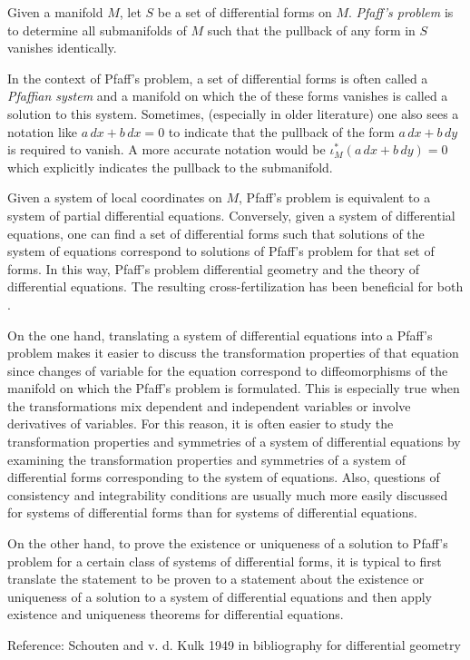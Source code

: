 \documentclass[12pt]{article}
\begin{document}
Given a manifold $M$, let $S$ be a set of differential forms on $M$.  \emph{Pfaff's problem} is to determine all submanifolds of $M$ such that the pullback of any form in $S$ vanishes identically.  

In the context of Pfaff's problem, a set of differential forms is often called a \emph{Pfaffian system} and a manifold on which the  of these forms vanishes is called a solution to this system.  Sometimes, (especially in older literature) one also sees a notation like $a \, dx + b\,dx = 0$ to indicate that the pullback of the form $a \, dx + b \, dy$ is required to vanish.  A more accurate notation would be $\iota_M^* (a \, dx + b \,dy) = 0$ which explicitly indicates the pullback to the submanifold.

Given a system of local coordinates on $M$, Pfaff's problem is equivalent to a system of partial differential equations.  Conversely, given a system of differential equations, one can find a set of differential forms such that solutions of the system of equations correspond to solutions of Pfaff's problem for that set of forms.  In this way, Pfaff's problem  differential geometry and the theory of differential equations.  The resulting cross-fertilization has been beneficial for both .

On the one hand, translating a system of differential equations into a Pfaff's problem makes it easier to discuss the transformation properties of that equation since changes of variable for the equation correspond to diffeomorphisms of the manifold on which the Pfaff's problem is formulated.  This is especially true when the transformations mix dependent and independent variables or involve derivatives of variables.  For this reason, it is often easier to study the transformation properties and symmetries of a system of differential equations by examining the transformation properties and symmetries of a system of differential forms corresponding to the system of equations.  Also, questions of consistency and integrability conditions are usually much more easily discussed for systems of differential forms than for systems of differential equations.

On the other hand, to prove the existence or uniqueness of a solution to Pfaff's problem for a certain class of systems of differential forms, it is typical to first translate the statement to be proven to a statement about the existence or uniqueness of a solution to a system of differential equations and then apply existence and uniqueness theorems for differential equations.

Reference: Schouten and v. d. Kulk 1949 in bibliography for differential geometry
\end{document}
